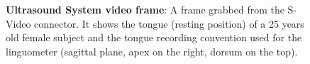 \begin{figure}[htbp]
	\centering
	\caption[Ultrasound System video frame]{\textbf{Ultrasound System video frame}:
	A frame grabbed from the S-Video connector. It shows the tongue (resting
	position) of a 25
	years old female subject and the tongue recording convention used for the
	linguometer (sagittal plane, apex on the right, dorsum on the top).}
	\label{fig:linguometer:us:frame}
\end{figure}
